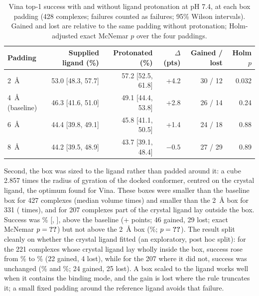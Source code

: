 \begin{table}[h]
  \centering
  \caption{Vina top-1 success with and without ligand protonation at pH 7.4, at each box
    padding (428 complexes; failures counted as failures; 95\% Wilson intervals). Gained
    and lost are relative to the same padding without protonation; Holm-adjusted exact
    McNemar $p$ over the four paddings.}
  \label{tab:interaction}
  \begin{tabular}{lrrrrr}
    \toprule
    Padding & Supplied ligand (\%) & Protonated (\%) & $\Delta$ (pts) & Gained / lost & Holm $p$ \\
    \midrule
    \SI{2}{\angstrom} & 53.0 [48.3, 57.7] & 57.2 [52.5, 61.8] & +4.2 & 30 / 12 & 0.032 \\
    \SI{4}{\angstrom} (baseline) & 46.3 [41.6, 51.0] & 49.1 [44.4, 53.8] & +2.8 & 26 / 14 & 0.24 \\
    \SI{6}{\angstrom} & 44.4 [39.8, 49.1] & 45.8 [41.1, 50.5] & +1.4 & 24 / 18 & 0.88 \\
    \SI{8}{\angstrom} & 44.2 [39.5, 48.9] & 43.7 [39.1, 48.4] & $-0.5$ & 27 / 29 & 0.89 \\
    \bottomrule
  \end{tabular}
\end{table}

Second, the box was sized to the ligand rather than padded around it: a cube 2.857 times
the radius of gyration of the docked conformer, centred on the crystal ligand, the
optimum \citet{feinstein2015boxsize} found for Vina. These boxes were smaller than the
baseline box for 427 complexes (median volume  times) and smaller than the
\SI{2}{\angstrom} box for 331 ( times), and for 207 complexes part of the crystal
ligand lay outside the box. Success was \% [, ], above the baseline (+
points; 46 gained, 29 lost; exact McNemar $p = \val{followup_gyration/vs_baseline/p}$) but not above the
\SI{2}{\angstrom} box (\%; $p = \val{followup_gyration/vs_box_padding_2/p}$). The result split cleanly on whether the
crystal ligand fitted (an exploratory, post hoc split): for the 221 complexes whose
crystal ligand lay wholly inside the box, success rose from \% to \% (22 gained,
4 lost), while for the 207 where it did not, success was unchanged (\% and \%; 24
gained, 25 lost). A box scaled to the ligand works well when it contains the binding
mode, and the gain is lost where the rule truncates it; a small fixed padding around the
reference ligand avoids that failure.

